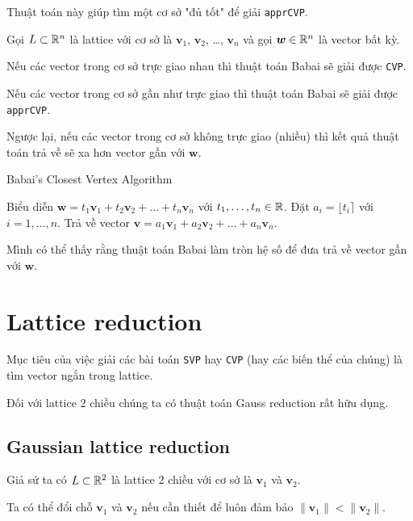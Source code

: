Thuật toán này giúp tìm một cơ sở "đủ tốt" để giải \texttt{apprCVP}.

\begin{theorem}
    Gọi $L \subset \mathbb{R}^n$ là lattice với cơ sở là $\bm{v}_1$, $\bm{v}_2$, \dots, $\bm{v}_n$ và gọi $\bm{w} \in \mathbb{R}^n$ là vector bất kỳ. 
    
    Nếu các vector trong cơ sở trực giao nhau thì thuật toán Babai sẽ giải được \texttt{CVP}.

    Nếu các vector trong cơ sở gần như trực giao thì thuật toán Babai sẽ giải được \texttt{apprCVP}.

    Ngược lại, nếu các vector trong cơ sở không trực giao (nhiều) thì kết quả thuật toán trả về sẽ xa hơn vector gần với $\bm{w}$.
\end{theorem}

\begin{algorithm}[htb]
    \caption{Babai's Closest Vertex Algorithm}
    \begin{algorithmic}
        \State Biểu diễn $\bm{w} = t_1 \bm{v}_1 + t_2 \bm{v}_2 + \ldots + t_n \bm{v}_n$ với $t_1, \ldots, t_n \in \mathbb{R}$.
        \State Đặt $a_i = \lfloor t_i \rceil$ với $i = 1, \ldots, n$.
        \State Trả về vector $\bm{v} = a_1 \bm{v}_1 + a_2 \bm{v}_2 + \ldots + a_n \bm{v}_n$.
    \end{algorithmic}
\end{algorithm}

Mình có thể thấy rằng thuật toán Babai làm tròn hệ số để đưa trả về vector gần với $\bm{w}$.

\section{Lattice reduction}

Mục tiêu của việc giải các bài toán \texttt{SVP} hay \texttt{CVP} (hay các biến thể của chúng) là tìm vector ngắn trong lattice.

Đối với lattice 2 chiều chúng ta có thuật toán Gauss reduction rất hữu dụng.

\subsection*{Gaussian lattice reduction}

Giả sử ta có $L \subset \mathbb{R}^2$ là lattice 2 chiều với cơ sở là $\bm{v}_1$ và $\bm{v}_2$.

Ta có thể đổi chỗ $\bm{v}_1$ và $\bm{v}_2$ nếu cần thiết để luôn đảm bảo $\lVert \bm{v}_1 \rVert < \lVert \bm{v}_2 \rVert$.

